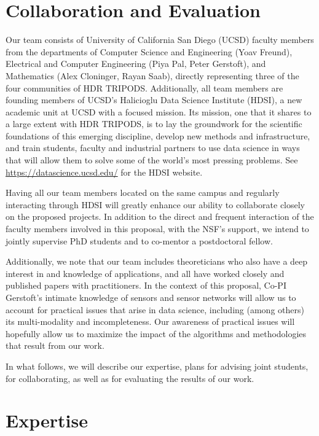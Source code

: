 \documentclass{article}
\begin{document}
\section{Collaboration and Evaluation}
\vspace{1cm}

Our team consists of University of California San Diego (UCSD) faculty members from the departments of Computer Science and Engineering (Yoav Freund), Electrical and Computer Engineering (Piya Pal, Peter Gerstoft), and Mathematics (Alex Cloninger, Rayan Saab), directly representing three of the four communities of HDR TRIPODS.  Additionally, all team members are founding members of UCSD's Halicioglu Data Science Institute (HDSI), a new academic unit at UCSD with a focused mission. Its mission, one that it shares to a large extent with HDR TRIPODS, is to lay the groundwork for the scientific foundations of this emerging discipline, develop new methods and infrastructure, and train students, faculty and industrial partners to use data science in ways that will allow them to solve some of the world’s most pressing problems. See  \url{https://datascience.ucsd.edu/} for {the HDSI website}. 

Having all our team members located on the same campus and regularly interacting through HDSI will greatly enhance our ability to collaborate closely on the proposed projects. In addition to the direct and frequent interaction of the faculty members involved in this proposal, with the NSF's support, we intend to jointly supervise PhD students and to co-mentor a postdoctoral fellow. 

Additionally, we note that our team includes theoreticians who also have a deep interest in and knowledge of applications, and all  have worked closely and published papers with practitioners. In the context of this proposal, Co-PI Gerstoft's intimate knowledge of sensors and sensor networks will allow us to account for practical issues that arise in data science, including (among others) its multi-modality and incompleteness. Our awareness of practical issues will hopefully allow us to maximize the impact of the algorithms and methodologies that result from our work.  

In what follows, we will describe our expertise, plans for advising joint students, for collaborating, as well as for evaluating the results of our work.  
 
 \vspace{1cm}
\section{Expertise}
\end{document}
